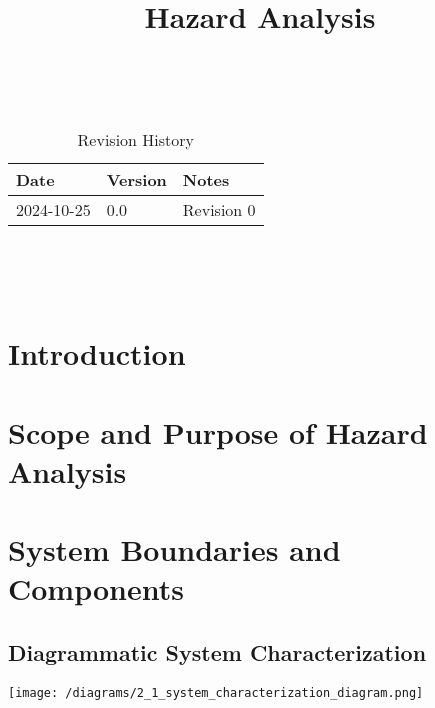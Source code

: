 \documentclass{article}
\title{Hazard Analysis\\\progname}
\author{\authname}
\date{}
\begin{document}
\maketitle
\thispagestyle{empty}

~\newpage


\begin{table}[hp]
\caption{Revision History} \label{TblRevisionHistory}
\begin{tabularx}{\textwidth}{llX}
\toprule
\toprule {\textbf{Date}} & {\textbf{Version}} & {\textbf{Notes}}\\
\midrule
2024-10-25 & 0.0 & Revision 0\\
\bottomrule
\end{tabularx}
\end{table}

~\newpage

\tableofcontents

~\newpage


\section{Introduction}


\section{Scope and Purpose of Hazard Analysis}


\section{System Boundaries and Components}
\subsection{Diagrammatic System Characterization}
\begin{center}
    \texttt{[image: /diagrams/2\_1\_system\_characterization\_diagram.png]}
\end{center}
\end{document}
